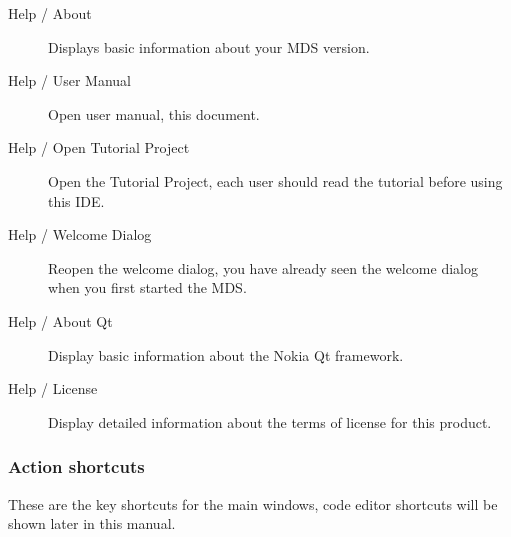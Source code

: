 \begin{description}
            \item[Help / About] Displays basic information about your MDS version.
            \item[Help / User Manual] Open user manual, this document.
            \item[Help / Open Tutorial Project] Open the Tutorial Project, each user should read the tutorial before using this IDE.
            \item[Help / Welcome Dialog] Reopen the welcome dialog, you have already seen the welcome dialog when you first started the MDS.
            \item[Help / About Qt] Display basic information about the Nokia Qt framework.
            \item[Help / License] Display detailed information about the terms of license for this product.
        \end{description}

        \subsubsection{Action shortcuts}
            These are the key shortcuts for the main windows, code editor shortcuts will be shown later in this manual.

